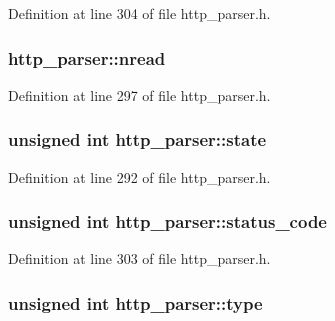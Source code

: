Definition at line 304 of file http\-\_\-parser.\-h.

\hypertarget{structhttp__parser_a78085ca896bb3b9aa1ecb0f6fddc039d}{
\subsubsection[{nread}]{ http\-\_\-parser\-::nread}}\label{structhttp__parser_a78085ca896bb3b9aa1ecb0f6fddc039d}


Definition at line 297 of file http\-\_\-parser.\-h.

\hypertarget{structhttp__parser_a6f5952e0b47c83aeacf64fc287fd8003}{
\subsubsection[{state}]{\setlength{\rightskip}{0pt plus 5cm}unsigned int http\-\_\-parser\-::state}}\label{structhttp__parser_a6f5952e0b47c83aeacf64fc287fd8003}


Definition at line 292 of file http\-\_\-parser.\-h.

\hypertarget{structhttp__parser_a82f5aed92ca3566489def7bc384bab26}{
\subsubsection[{status\-\_\-code}]{\setlength{\rightskip}{0pt plus 5cm}unsigned int http\-\_\-parser\-::status\-\_\-code}}\label{structhttp__parser_a82f5aed92ca3566489def7bc384bab26}


Definition at line 303 of file http\-\_\-parser.\-h.

\hypertarget{structhttp__parser_ac6c327558547d55eb64a8aea1310cc2e}{
\subsubsection[{type}]{\setlength{\rightskip}{0pt plus 5cm}unsigned int http\-\_\-parser\-::type}}\label{structhttp__parser_ac6c327558547d55eb64a8aea1310cc2e}


